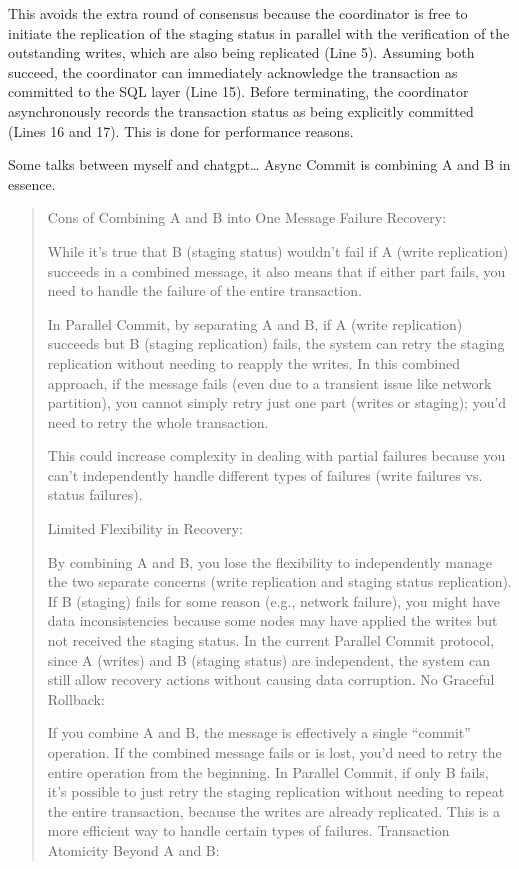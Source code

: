 \documentclass[11pt]{article}
\begin{document}
This avoids the extra round of consensus because the coordinator is free to initiate the
replication of the staging status in parallel with the verification of the outstanding writes, which
are also being replicated (Line 5). Assuming both succeed, the coordinator can immediately acknowledge
the transaction as committed to the SQL layer (Line 15). Before terminating, the coordinator
asynchronously records the transaction status as being explicitly committed (Lines 16 and 17). This is
done for performance reasons.

Some talks between myself and chatgpt\ldots{}
Async Commit is combining A and B in essence.
\begin{quote}
Cons of Combining A and B into One Message
Failure Recovery:

While it's true that B (staging status) wouldn't fail if A (write replication) succeeds in a combined message, it also means that if either part fails, you need to handle the failure of the entire transaction.

In Parallel Commit, by separating A and B, if A (write replication) succeeds but B (staging replication) fails, the system can retry the staging replication without needing to reapply the writes. In this combined approach, if the message fails (even due to a transient issue like network partition), you cannot simply retry just one part (writes or staging); you'd need to retry the whole transaction.

This could increase complexity in dealing with partial failures because you can't independently handle different types of failures (write failures vs. status failures).

Limited Flexibility in Recovery:

By combining A and B, you lose the flexibility to independently manage the two separate concerns (write replication and staging status replication). If B (staging) fails for some reason (e.g., network failure), you might have data inconsistencies because some nodes may have applied the writes but not received the staging status.
In the current Parallel Commit protocol, since A (writes) and B (staging status) are independent, the system can still allow recovery actions without causing data corruption.
No Graceful Rollback:

If you combine A and B, the message is effectively a single ``commit'' operation. If the combined message fails or is lost, you'd need to retry the entire operation from the beginning. In Parallel Commit, if only B fails, it's possible to just retry the staging replication without needing to repeat the entire transaction, because the writes are already replicated. This is a more efficient way to handle certain types of failures.
Transaction Atomicity Beyond A and B:


\end{quote}
\end{document}
